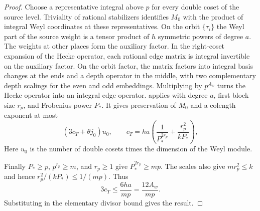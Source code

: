 \begin{proof}
Choose a representative integral above $p$ for every double coset of the source level. Triviality of rational stabilizers identifies $M_0$ with the product of integral Weyl coordinates at these representatives. On the orbit $\{\tau_i\}$ the Weyl part of the source weight is a tensor product of $h$ symmetric powers of degree $a$. The weights at other places form the auxiliary factor. In the right-coset expansion of the Hecke operator, each rational edge matrix is integral invertible on the auxiliary factor. On the orbit factor, the matrix factors into integral basis changes at the ends and a depth operator in the middle, with two complementary depth scalings for the even and odd embeddings. Multiplying by $p^{A_w}$ turns the Hecke operator into an integral edge operator.  applies with degree $a$, first block size $r_p$, and Frobenius power $P_*$. It gives preservation of $M_0$ and a colength exponent at most
\[
 (3c_T+\theta j_0)u_0,\qquad
 c_T=h a\left(\frac{1}{P_*^{2r_p}}+\frac{r_p^2}{kP_*}\right),
\]
Here $u_0$ is the number of double cosets times the dimension of the Weyl module.

Finally $P_*\ge p$, $p^{r_p}\ge m$, and $r_p\ge1$ give $P_*^{2r_p}\ge mp$. The scales also give $mr_p^2\le k$ and hence $r_p^2/(kP_*)\le1/(mp)$. Thus
\[
 3c_T\le \frac{6ha}{mp}=\frac{12A_w}{mp}.
\]
Substituting in the elementary divisor bound gives the result.
\end{proof}

